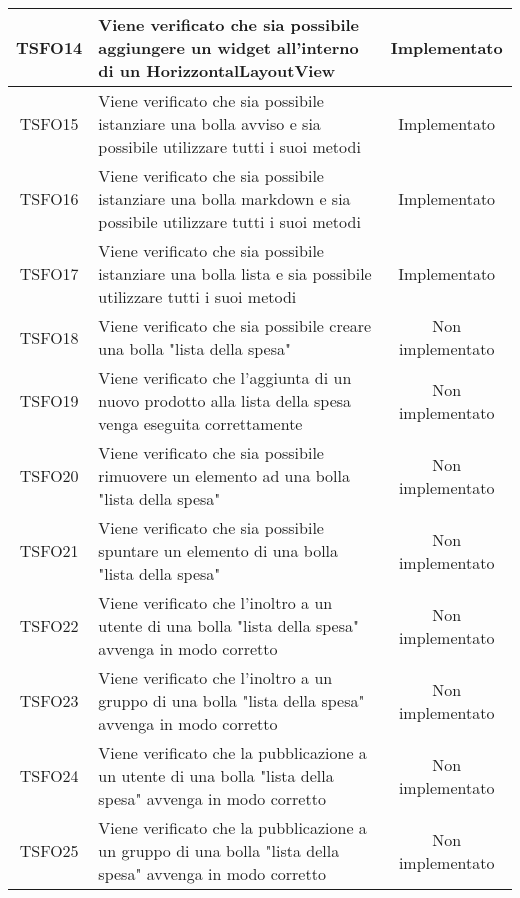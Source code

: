 \begin{center}
\begin{longtable}{|c|>{\centering}m{10cm}|c|}
		TSFO14 & Viene verificato che sia possibile aggiungere un widget all'interno di un HorizzontalLayoutView & Implementato \\ \hline
		TSFO15 & Viene verificato che sia possibile istanziare una bolla avviso e sia possibile utilizzare tutti i suoi metodi & Implementato \\ \hline
		TSFO16 & Viene verificato che sia possibile istanziare una bolla markdown e sia possibile utilizzare tutti i suoi metodi & Implementato \\ \hline
		TSFO17 & Viene verificato che sia possibile istanziare una bolla lista e sia possibile utilizzare tutti i suoi metodi & Implementato \\ \hline
		TSFO18 & Viene verificato che sia possibile creare una bolla "lista della spesa" & Non implementato \\ \hline
		TSFO19 & Viene verificato che l'aggiunta di un nuovo prodotto alla lista della spesa venga eseguita correttamente & Non implementato \\ \hline
		TSFO20 & Viene verificato che sia possibile rimuovere un elemento ad una bolla "lista della spesa" & Non implementato \\ \hline
		TSFO21 & Viene verificato che sia possibile spuntare un elemento di una bolla "lista della spesa" & Non implementato \\ \hline
		TSFO22 & Viene verificato che l'inoltro a un utente di una bolla "lista della spesa" avvenga in modo corretto & Non implementato \\ \hline
		TSFO23 & Viene verificato che l'inoltro a un gruppo di una bolla "lista della spesa" avvenga in modo corretto & Non implementato \\ \hline
		TSFO24 & Viene verificato che la pubblicazione a un utente di una bolla "lista della spesa" avvenga in modo corretto & Non implementato \\ \hline
		TSFO25 & Viene verificato che la pubblicazione a un gruppo di una bolla "lista della spesa" avvenga in modo corretto & Non implementato \\ \hline
	\end{longtable}
\end{center}
